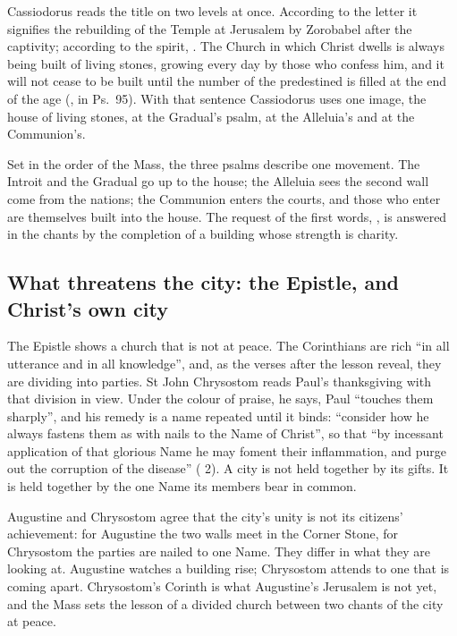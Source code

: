 Cassiodorus reads the title on two levels at once. According to the letter it
signifies the rebuilding of the Temple at Jerusalem by Zorobabel after the
captivity; according to the spirit, . The
Church in which Christ dwells is always being built of living stones, growing
every day by those who confess him, and it will not cease to be built until the
number of the predestined is filled at the end of the age (, in Ps.~95). With that sentence Cassiodorus uses one image, the
house of living stones, at the Gradual's psalm, at the Alleluia's and at the
Communion's.

Set in the order of the Mass, the three psalms describe one movement. The
Introit and the Gradual go up to the house; the Alleluia sees the second wall
come from the nations; the Communion enters the courts, and those who enter are
themselves built into the house. The request of the first words, , is answered in the chants by the completion of a building whose
strength is charity.

\subsection{What threatens the city: the Epistle, and Christ's own city}

The Epistle shows a church that is not at peace. The Corinthians are rich ``in
all utterance and in all knowledge'', and, as the verses after the lesson
reveal, they are dividing into parties. St John Chrysostom reads Paul's
thanksgiving with that division in view. Under the colour of praise, he says,
Paul ``touches them sharply'', and his remedy is a name repeated until it
binds: ``consider how he always fastens them as with nails to the Name of
Christ'', so that ``by incessant application of that glorious Name he may
foment their inflammation, and purge out the corruption of the disease''
( 2). A city is not held together by its
gifts. It is held together by the one Name its members bear in common.

Augustine and Chrysostom agree that the city's unity is not its citizens'
achievement: for Augustine the two walls meet in the Corner Stone, for
Chrysostom the parties are nailed to one Name. They differ in what they are
looking at. Augustine watches a building rise; Chrysostom attends to one that
is coming apart. Chrysostom's Corinth is what Augustine's Jerusalem is not
yet, and the Mass sets the lesson of a divided
church between two chants of the city at peace.

